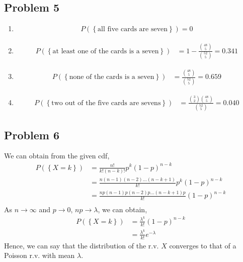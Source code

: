 \documentclass{article}
\begin{document}
	\subsection*{Problem 5}
		\begin{enumerate}
			\item
				\begin{align*}
					P\left(\left\{ \text{all five cards are seven} \right\}\right) = 0
				\end{align*}
			\item
				\begin{align*}
					P\left(\left\{ \text{at least one of the cards is a seven} \right\}\right) &= 1 - \frac{\binom{48}{5}}{\binom{52}{5}} = 0.341
				\end{align*}
			\item
				\begin{align*}
					P\left(\left\{ \text{none of the cards is a seven} \right\}\right) &= \frac{\binom{48}{5}}{\binom{52}{5}} = 0.659
				\end{align*}
			\item
				\begin{align*}
					P\left(\left\{ \text{two out of the five cards are sevens} \right\}\right) &= \frac{\binom{3}{2}\binom{48}{5}}{\binom{52}{5}} = 0.040
				\end{align*}
		\end{enumerate}

	\subsection*{Problem 6}
		We can obtain from the given cdf,
		\begin{align*}
			P(\left\{ X = k \right\}) &= \frac{n!}{k!(n-k)!} p^k (1-p)^{n-k} \\
			&= \frac{n(n-1)(n-2) \ldots (n-k+1)}{k!} p^k (1-p)^{n-k} \\
			&= \frac{np(n-1)p(n-2)p \ldots (n-k+1)p}{k!} (1-p)^{n-k} \\
		\end{align*}
		As $n \rightarrow \infty$ and $p \rightarrow 0$, $np \rightarrow \lambda$,
		we can obtain,
		\begin{align*}
			P(\left\{ X = k \right\}) &= \frac{\lambda^k}{k!} (1-p)^{n-k} \\
			&= \frac{\lambda^k}{k!} e^{-\lambda}
		\end{align*}
		Hence, we can say that the distribution of the r.v. $X$ converges to that of
		a Poisson r.v. with mean $\lambda$.
\end{document}
